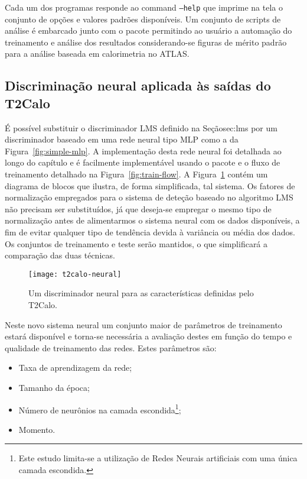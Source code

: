 Cada um dos programas responde ao command \texttt{--help} que imprime na tela
o conjunto de opções e valores padrões disponíveis. Um conjunto de scripts de
análise é embarcado junto com o pacote permitindo ao usuário a automação do
treinamento e análise dos resultados considerando-se figuras de mérito padrão
para a análise baseada em calorimetria no ATLAS.

\subsection{Discriminação neural aplicada às saídas do T2Calo}

É possível substituir o discriminador LMS definido na Seção{sec:lms} por um
discriminador baseado em uma rede neural tipo MLP como a da
Figura~\ref{fig:simple-mlp}. A implementação desta rede neural foi detalhada
ao longo do capítulo e é facilmente implementável usando o pacote
 e o fluxo de treinamento detalhado na
Figura~\ref{fig:train-flow}. A Figura~\ref{fig:t2calo-neural} contém um
diagrama de blocos que ilustra, de forma simplificada, tal sistema. Os fatores
de normalização empregados para o sistema de deteção baseado no algoritmo LMS
não precisam ser substituídos, já que deseja-se empregar o mesmo tipo de
normalização antes de alimentarmos o sistema neural com os dados disponíveis,
a fim de evitar qualquer tipo de tendência devida à variância ou média dos
dados. Os conjuntos de treinamento e teste serão mantidos, o que simplificará
a comparação das duas técnicas.

\begin{figure}
\begin{center}
\texttt{[image: t2calo-neural]}
\end{center}
\caption{Um discriminador neural para as características definidas pelo
T2Calo.}
\label{fig:t2calo-neural}
\end{figure}

Neste novo sistema neural um conjunto maior de parâmetros de treinamento
estará disponível e torna-se necessária a avaliação destes em função do tempo
e qualidade de treinamento das redes. Estes parâmetros são:

\begin{itemize}
\item Taxa de aprendizagem da rede;
\item Tamanho da época;
\item Número de neurônios na camada escondida\footnote{Este estudo
limita-se a utilização de Redes Neurais artificiais com uma única camada
escondida.};
\item Momento.
\end{itemize}


